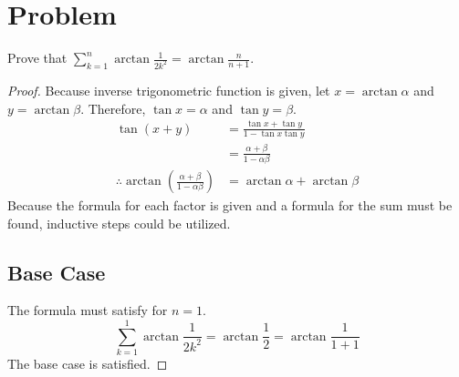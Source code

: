 \documentclass{article}
\begin{document}
\section*{Problem}
Prove that $\sum_{k=1}^{n} \arctan \frac{1}{2k^2} = \arctan \frac{n}{n+1}$.
\begin{proof}
    Because inverse trigonometric function is given, let $x = \arctan\alpha$ and $y = \arctan\beta$. Therefore, $\tan x = \alpha$ and $\tan y = \beta$.
    \begin{align*}
        \tan(x + y) 
        &= \frac{\tan x + \tan y}{1 - \tan x \tan y} \\
        &= \frac{\alpha + \beta}{1 - \alpha\beta} \\
        \therefore \arctan \left( \frac{\alpha + \beta}{1 - \alpha\beta} \right) &= \arctan\alpha + \arctan\beta
    \end{align*}
    Because the formula for each factor is given and a formula for the sum must be found, inductive steps could be utilized.
    
    \subsection*{Base Case}
    The formula must satisfy for $n=1$.
    \[
    \sum_{k = 1}^{1} \arctan \frac{1}{2k^2} = \arctan \frac{1}{2} = \arctan \frac{1}{1 + 1}
    \]
    The base case is satisfied.


\end{proof}
\end{document}
